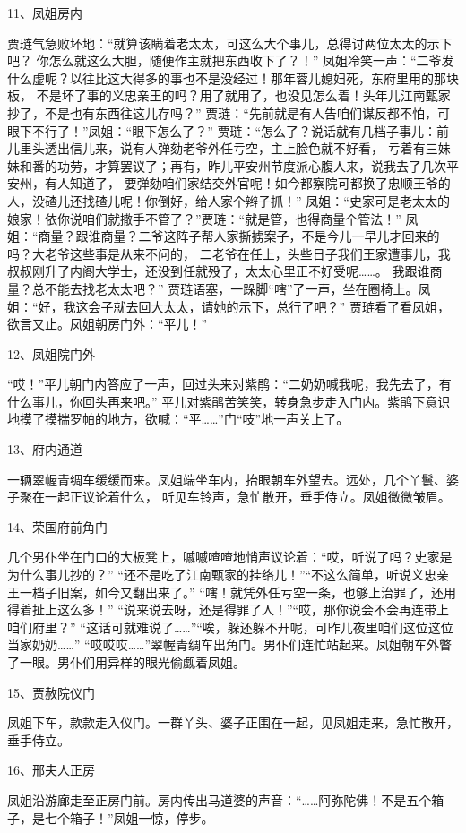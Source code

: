 11、凤姐房内\par
贾琏气急败坏地：“就算该瞒着老太太，可这么大个事儿，总得讨两位太太的示下吧？
你怎么就这么大胆，随便作主就把东西收下了？！”
凤姐冷笑一声：“二爷发什么虚呢？以往比这大得多的事也不是没经过！那年蓉儿媳妇死，东府里用的那块板，
不是坏了事的义忠亲王的吗？用了就用了，也没见怎么着！头年儿江南甄家抄了，不是也有东西往这儿存吗？” 
贾琏：“先前就是有人告咱们谋反都不怕，可眼下不行了！”凤姐：“眼下怎么了？” 
贾琏：“怎么了？说话就有几档子事儿：前儿里头透出信儿来，说有人弹劾老爷外任亏空，主上脸色就不好看，
亏着有三妹妹和番的功劳，才算罢议了；再有，昨儿平安州节度派心腹人来，说我去了几次平安州，有人知道了，
要弹劾咱们家结交外官呢！如今都察院可都换了忠顺王爷的人，没碴儿还找碴儿呢！你倒好，给人家个辫子抓！”
凤姐：“史家可是老太太的娘家！依你说咱们就撒手不管了？”贾琏：“就是管，也得商量个管法！”
凤姐：“商量？跟谁商量？二爷这阵子帮人家撕掳案子，不是今儿一早儿才回来的吗？大老爷这些事是从来不问的，
二老爷在任上，头些日子我们王家遭事儿，我叔叔刚升了内阁大学士，还没到任就殁了，太太心里正不好受呢……。
我跟谁商量？总不能去找老太太吧？”
贾琏语塞，一跺脚“嗐”了一声，坐在圈椅上。凤姐：“好，我这会子就去回大太太，请她的示下，总行了吧？” 
贾琏看了看凤姐，欲言又止。凤姐朝房门外：“平儿！” 

12、凤姐院门外\par
“哎！”平儿朝门内答应了一声，回过头来对紫鹃：“二奶奶喊我呢，我先去了，有什么事儿，你回头再来吧。”
平儿对紫鹃苦笑笑，转身急步走入门内。紫鹃下意识地摸了摸揣罗帕的地方，欲喊：“平……”门“吱”地一声关上了。 

13、府内通道\par
一辆翠幄青绸车缓缓而来。凤姐端坐车内，抬眼朝车外望去。远处，几个丫鬟、婆子聚在一起正议论着什么，
听见车铃声，急忙散开，垂手侍立。凤姐微微皱眉。 

14、荣国府前角门\par
几个男仆坐在门口的大板凳上，嘁嘁喳喳地悄声议论着：“哎，听说了吗？史家是为什么事儿抄的？” 
“还不是吃了江南甄家的挂络儿！”“不这么简单，听说义忠亲王一档子旧案，如今又翻出来了。” 
“嗐！就凭外任亏空一条，也够上治罪了，还用得着扯上这么多！”
“说来说去呀，还是得罪了人！”“哎，那你说会不会再连带上咱们府里？” 
“这话可就难说了……”“唉，躲还躲不开呢，可昨儿夜里咱们这位这位当家奶奶……”
“哎哎哎……”翠幄青绸车出角门。男仆们连忙站起来。凤姐朝车外瞥了一眼。男仆们用异样的眼光偷觑着凤姐。 

15、贾赦院仪门\par
凤姐下车，款款走入仪门。一群丫头、婆子正围在一起，见凤姐走来，急忙散开，垂手侍立。 

16、邢夫人正房\par
凤姐沿游廊走至正房门前。房内传出马道婆的声音：“……阿弥陀佛！不是五个箱子，是七个箱子！”凤姐一惊，停步。 


